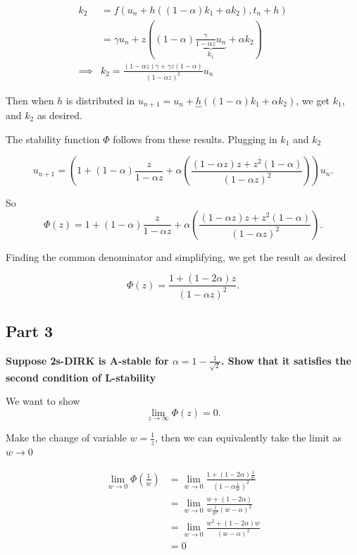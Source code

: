 \documentclass[12pt,a4paper]{article}
\begin{document}
\begin{align*}
  k_2 &= f(u_n + h \left((1- \alpha) k_1 + a k_2\right), t_n + h) \\
      &= \gamma u_n + z \left((1- \alpha)\underbrace{\frac{ \gamma}{1- \alpha
      z }u_n}_{k_1} + \alpha k_2\right) \\
  \implies &\boxed{k_2 = \frac{(1- \alpha z) \gamma + \gamma z (1- \alpha)}{(1-
  \alpha z)^{2}} u_n}
\end{align*}

\par Then when $h$ is distributed in $u_{n+1} = u_{n} + \underbrace{h} ((1-
  \alpha)k_1 + \alpha k_2)$, we get $k_1$, and $k_2$ as desired.

  The stability function $\Phi$ follows from these results. Plugging in $k_1$
  and $k_2$
  
  \[
    u_{n+1} = \left(1 + (1- \alpha) \frac{z}{1- \alpha z } + \alpha \left(
    \frac{ (1- \alpha z)z + z^{2}(1- \alpha) }{(1- \alpha z)^{2}}
\right)\right) u_n
  .\] 

  So 
  \[
  \Phi(z) = 1 + (1- \alpha) \frac{z}{1- \alpha z } + \alpha \left(
    \frac{ (1- \alpha z)z + z^{2}(1- \alpha) }{(1- \alpha z)^{2}}
\right)
  .\] 

  \par Finding the common denominator and simplifying, we get the result as desired

  \[
    \boxed{\Phi(z) = \frac{ 1 + (1-2 \alpha)z }{(1- \alpha z)^{2}}}
  .\] 
\subsection{Part 3}%
\label{sub:part_3}

\par \textbf{Suppose 2s-DIRK is A-stable for $ \alpha
= 1 - \frac{1}{\sqrt{2}}$. Show that it satisfies the second condition of
L-stability} 

We want to show 
\[
  \lim_{z \to \infty} \Phi (z) = 0
.\] 

Make the change of variable $w = \frac{1}{z}$, then we can equivalently take
the limit as $w \to 0$

 \begin{align*}
   \lim_{w \to 0} \Phi(\frac{1}{w}) &= \lim_{w \to 0} \frac{ 1 + (1-2 \alpha) \frac{1}{w}
   }{(1 - \alpha \frac{1}{w})^{2}} \\
   &= \lim_{w \to 0} \frac{ w + (1-2 \alpha) }{w \frac{1}{w^{2}}(w- \alpha)^{2}} \\
   &= \lim_{w \to 0} \frac{ w^{2} + (1- 2 \alpha) w }{(w- \alpha)^{2}} \\
   &= 0
\end{align*}
\end{document}

